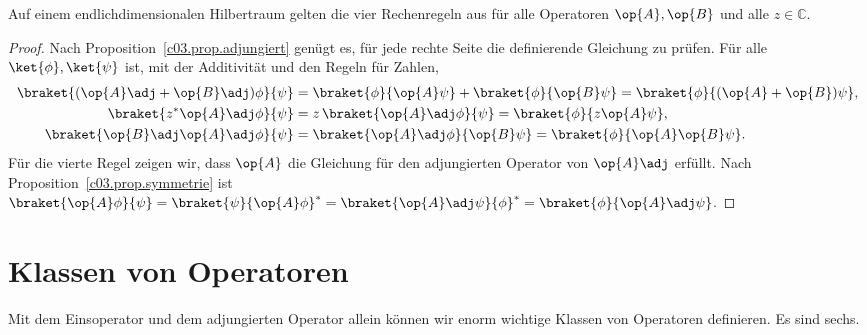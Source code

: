 \begin{proposition}[Rechenregeln]\label{c03.prop.adj-regeln}
  Auf einem endlichdimensionalen Hilbertraum gelten die vier Rechenregeln aus  für
  alle Operatoren $\op{A}, \op{B}$ und alle $z \in \mathbb{C}$.
\end{proposition}
\begin{proof}
  Nach Proposition~\ref{c03.prop.adjungiert} genügt es, für jede rechte Seite die definierende
  Gleichung zu prüfen. Für alle $\ket{\phi}, \ket{\psi}$ ist, mit der Additivität und den
  Regeln für Zahlen,
  \begin{equation}\label{c03.eq.adj-regeln}
    \begin{aligned}
      \braket{(\op{A}\adj + \op{B}\adj)\phi}{\psi}
        &= \braket{\phi}{\op{A}\psi} + \braket{\phi}{\op{B}\psi}
         = \braket{\phi}{(\op{A} + \op{B})\psi} , \\
      \braket{z^* \op{A}\adj\phi}{\psi}
        &= z\, \braket{\op{A}\adj\phi}{\psi}
         = \braket{\phi}{z\op{A}\psi} , \\
      \braket{\op{B}\adj\op{A}\adj\phi}{\psi}
        &= \braket{\op{A}\adj\phi}{\op{B}\psi}
         = \braket{\phi}{\op{A}\op{B}\psi} .
    \end{aligned}
  \end{equation}
  Für die vierte Regel zeigen wir, dass $\op{A}$ die Gleichung für den adjungierten Operator von
  $\op{A}\adj$ erfüllt. Nach Proposition~\ref{c03.prop.symmetrie} ist
  $\braket{\op{A}\phi}{\psi} = \braket{\psi}{\op{A}\phi}^* = \braket{\op{A}\adj\psi}{\phi}^* = \braket{\phi}{\op{A}\adj\psi}$.
\end{proof}

\section{Klassen von Operatoren}\label{c03.s10}

Mit dem Einsoperator und dem adjungierten Operator allein können wir enorm wichtige Klassen von
Operatoren definieren. Es sind sechs.




